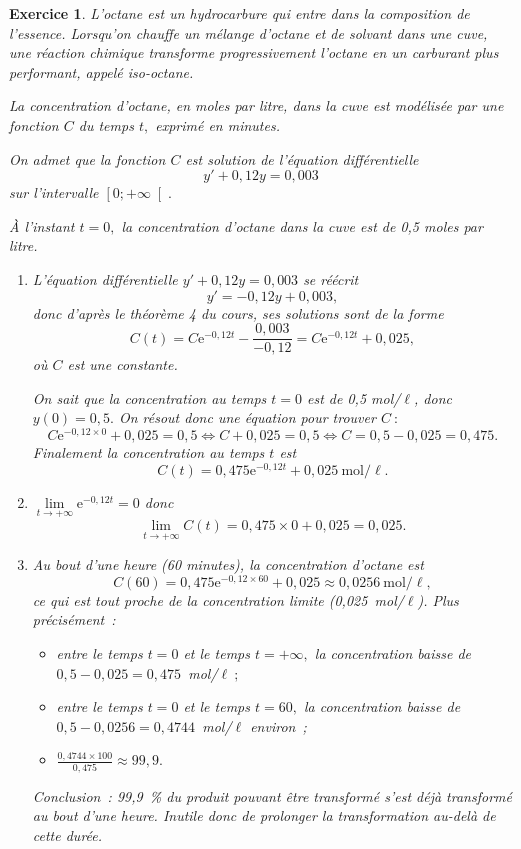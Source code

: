 \documentclass[10pt]{article}
\newtheorem{exo}{Exercice}
\begin{document}
\begin{exo}

L'octane est un hydrocarbure qui entre dans la composition de l'essence. Lorsqu'on chauffe un mélange d'octane et de solvant dans une cuve, une réaction chimique transforme progressivement l'octane en un carburant plus performant, appelé iso-octane.

La concentration d'octane, en moles par litre, dans la cuve est modélisée par une fonction $C$ du temps $t,$ exprimé en minutes.

On admet que la fonction $C$ est solution de l'équation différentielle \[y'+0,12y=0,003\] sur l'intervalle $\left[0;+\infty\right[.$

À l'instant $t=0,$ la concentration d'octane dans la cuve est de 0,5 moles par litre.

\begin{enumerate}
\item L'équation différentielle $y'+0,12y=0,003$ se réécrit
\[y'=-0,12y+0,003,\] donc d'après le théorème 4 du cours, ses solutions sont de la forme
\[C(t)=C\text{e}^{-0,12t}-\frac{0,003}{-0,12}=C\text{e}^{-0,12t}+0,025,\] où $C$ est une constante.

\medskip

On sait que la concentration au temps $t=0$ est de 0,5 mol/$\ell$, donc $y(0)=0,5.$ On résout donc une équation pour trouver $C~:$
\[C\text{e}^{-0,12\times 0}+0,025=0,5\iff C+0,025=0,5\iff C=0,5-0,025=0,475.\] Finalement la concentration au temps $t$ est
\[C(t)=0,475\text{e}^{-0,12t}+0,025~\text{mol}/\ell.\]
\item $\lim\limits_{t\to +\infty}\text{e}^{-0,12t}=0$ donc
\[\lim\limits_{t\to +\infty}C(t)=0,475\times 0+0,025=0,025.\]
\item Au bout d'une heure (60 minutes), la concentration d'octane est
\[C(60)=0,475\text{e}^{-0,12\times 60}+0,025\approx 0,0256~\text{mol}/\ell,\] ce qui est tout proche de la concentration limite (0,025~mol/$\ell$). Plus précisément~:

\begin{itemize}
\item[\textbullet] entre le temps $t=0$ et le temps $t=+\infty,$ la concentration baisse de $0,5-0,025=0,475$~mol/$\ell~;$
\item[\textbullet] entre le temps $t=0$ et le temps $t=60,$ la concentration baisse de $0,5-0,0256=0,4744$~mol/$\ell$ environ~;
\item[\textbullet] $\frac{0,4744\times 100}{0,475}\approx 99,9.$
\end{itemize}

Conclusion~: 99,9~\% du produit pouvant être transformé s'est déjà transformé au bout d'une heure. Inutile donc de prolonger la transformation au-delà de cette durée.
\end{enumerate}

\end{exo}
\end{document}
